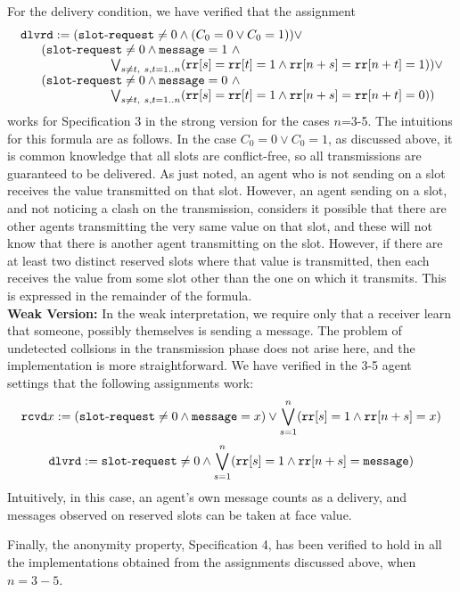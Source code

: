 \documentclass[]{llncs}
\newcommand{\dlvrd}{{\tt dlvrd}}
\newcommand{\rr}{{\tt rr}}
\newcommand{\rcvd}{{\tt rcvd}}
\newcommand{\slotrequest}{{\tt slot\mbox{-}request}}
\newcommand{\msg}{{\tt message}}
\begin{document}
For the delivery condition, we have verified that the assignment 
$$ 
\begin{array}{l} 
\dlvrd := (\slotrequest \neq 0 \land (C_0 = 0\lor C_0 = 1) ) \lor \\ 
~~~~~         (\slotrequest \neq 0 \land  \msg = 1 ~\land \\
\hspace{1in}   \bigvee_{s\neq t,~s,t =1..n} (\rr[s] = \rr[t] = 1 \land \rr[n+s] = \rr[n+t] = 1)) \lor  \\         
~~~~~          (\slotrequest \neq 0 \land \msg = 0~ \land \\
\hspace{1in}  \bigvee_{s\neq t,~s,t =1..n} (\rr[s] = \rr[t] = 1 \land  \rr[n+s] = \rr[n+t] = 0)) 
\end{array} 
$$ 
works for Specification 3 in the strong version for the cases $n$=3-5. 
The intuitions for this formula are as follows. In the case $C_0 = 0\lor C_0 = 1$, 
as discussed above, it is common knowledge that all slots are conflict-free, so all transmissions are 
guaranteed to be delivered. As just noted, an agent who is not sending on a slot 
receives the value transmitted on that slot. However, an agent sending on a slot, and not noticing 
a clash on the transmission, considers it possible that there are other agents transmitting the
very same value on that slot, and these will not know that there is another agent transmitting on the 
slot. However, if there are at least two distinct reserved slots where that value is transmitted, then 
each receives the value from some slot other than the one  on which it transmits. This is expressed in the remainder of
the formula. \\

\noindent
{\bf Weak Version:} 
In the weak interpretation, we require only that a receiver learn that someone, possibly themselves is sending 
a message. The problem of undetected collsions in the transmission phase does not arise here, 
and the implementation is more straightforward. 
We have verified in the 3-5 agent settings that the following assignments work: 
$$\rcvd x := (\slotrequest \neq 0 \land \msg = x) \lor   \bigvee_{s=1}^n (\rr[s] = 1 \land \rr[n+s] =x)$$ 
$$\dlvrd :=  \slotrequest \neq 0 \land  \bigvee_{s=1}^n (\rr[s] = 1 \land \rr[n+s] = \msg)$$ 
Intuitively, in this case, an agent's own message counts as a delivery, and 
messages observed  on reserved slots can be taken at face value. 

Finally, the anonymity property, Specification 4, has been verified to hold in all the implementations obtained
from the assignments discussed above, when $n = 3-5$. 
\end{document}
